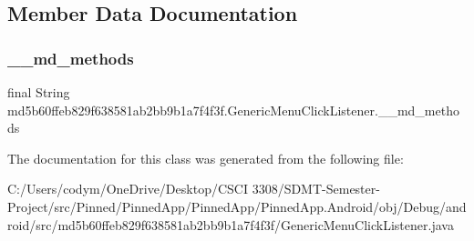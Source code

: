 \subsection{Member Data Documentation}
\mbox{\label{classmd5b60ffeb829f638581ab2bb9b1a7f4f3f_1_1_generic_menu_click_listener_a6c9c1226d60f05dc9be14f20174fdebb}} 
\subsubsection{\texorpdfstring{\+\_\+\+\_\+md\+\_\+methods}{\_\_md\_methods}}
{\footnotesize\ttfamily final String md5b60ffeb829f638581ab2bb9b1a7f4f3f.\+Generic\+Menu\+Click\+Listener.\+\_\+\+\_\+md\+\_\+methods\hspace{0.3cm}{\ttfamily [static]}}



The documentation for this class was generated from the following file\+:\begin{DoxyCompactItemize}
\item 
C\+:/\+Users/codym/\+One\+Drive/\+Desktop/\+C\+S\+C\+I 3308/\+S\+D\+M\+T-\/\+Semester-\/\+Project/src/\+Pinned/\+Pinned\+App/\+Pinned\+App/\+Pinned\+App.\+Android/obj/\+Debug/android/src/md5b60ffeb829f638581ab2bb9b1a7f4f3f/Generic\+Menu\+Click\+Listener.\+java\end{DoxyCompactItemize}
